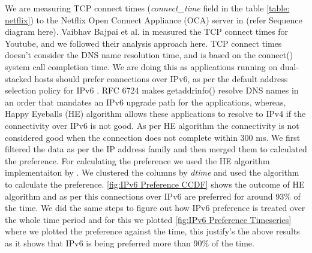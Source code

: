 We are measuring TCP connect times (\textit{connect\_time} field in the table \ref{table: netflix}) to the Netflix Open Connect Appliance (OCA) server in (refer Sequence diagram here). Vaibhav Bajpai et al. in \cite{bajpaimeasuring} measured the TCP connect times for Youtube, and we followed their analysis approach here. TCP connect times doesn't consider the DNS name resolution time, and is based on the connect() system call completion time. 
We are doing this as applications running on dual-stacked hosts should prefer connections over IPv6, as per the default address selection policy for IPv6 \cite{rfc6724}. 
RFC 6724 makes getaddrinfo() resolve DNS names in an order that mandates an IPv6 upgrade path for the applications, whereas, Happy Eyeballs (HE) algorithm \cite{rfc6555} allows these applications to resolve to IPv4 if the connectivity over IPv6 is not good. As per HE algorithm the connectivity is not considered good when the connection does not complete within 300 ms. We first filtered the data as per the IP address family and then merged them to calculated the preference. For calculating the preference we used the HE algorithm implementaiton by \cite{bajpaimeasuring}. We clustered the columns by \textit{dtime} and used the algorithm to calculate the preference. \cref{fig:IPv6 Preference CCDF} shows the outcome of HE algorithm and as per this connections over IPv6 are preferred for around 93\% of the time. We did the same steps to figure out how IPv6 preference is treated over the whole time period and for this we plotted \cref{fig:IPv6 Preference Timeseries} where we plotted the preference against the time, this justify's the above results as it shows that IPv6 is being preferred more than 90\% of the time. 

